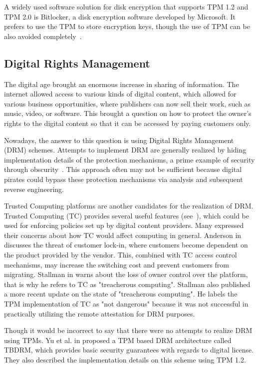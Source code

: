 A widely used software solution for disk encryption that supports TPM 1.2 and TPM 2.0 is Bitlocker, a disk encryption software developed by Microsoft. It prefers to use the TPM to store encryption keys, though the use of TPM can be also avoided completely~\cite{bitlockerMDocs}.

\subsection{Digital Rights Management}
The digital age brought an enormous increase in sharing of information. The internet allowed access to various kinds of digital content, which allowed for various business opportunities, where publishers can now sell their work, such as music, video, or software. This brought a question on how to protect the owner's rights to the digital content so that it can be accessed by paying customers only.

Nowadays, the answer to this question is using Digital Rights Management (DRM) schemes. Attempts to implement DRM are generally realized by hiding implementation details of the protection mechanisms, a prime example of security through obscurity~\cite{liu2003digital}. This approach often may not be sufficient because digital pirates could bypass these protection mechanisms via analysis and subsequent reverse engineering.

Trusted Computing platforms are another candidates for the realization of DRM. Trusted Computing (TC) provides several useful features (see~), which could be used for enforcing policies set up by digital content providers. Many expressed their concerns about how TC would affect computing in general. Anderson in \cite{anderson2003cryptography} discusses the threat of customer lock-in, where customers become dependent on the product provided by the vendor. This, combined with TC access control mechanisms, may increase the switching cost and prevent customers from migrating. Stallman in \cite{stallman2002treacherous} warns about the loss of owner control over the platform, that is why he refers to TC as "treacherous computing". Stallman \cite{stallman2002treacherous} also published a more recent update on the state of "treacherous computing". He labels the TPM implementation of TC as "not dangerous" because it was not successful in practically utilizing the remote attestation for DRM purposes. 

Though it would be incorrect to say that there were no attempts to realize DRM using TPMs. Yu et al. in \cite{yu2009tbdrm} proposed a TPM based DRM architecture called TBDRM, which provides basic security guarantees with regards to digital license. They also described the implementation details on this scheme using TPM 1.2. 

